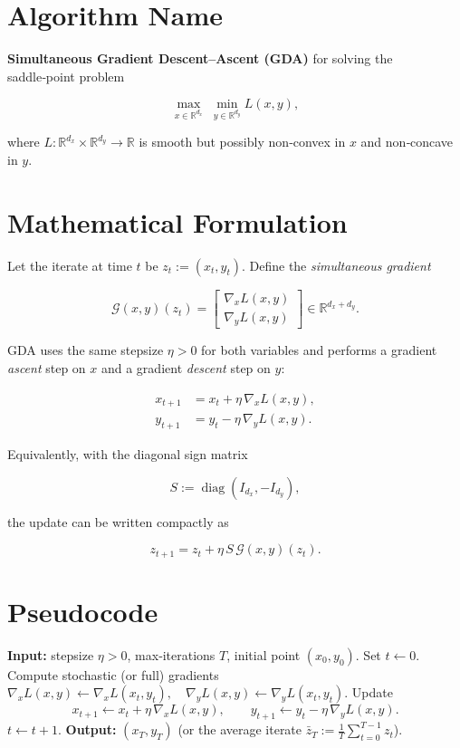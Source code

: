 \documentclass{article}
\newcommand{\gradx}{\nabla_{x} L(x,y)}
\newcommand{\grady}{\nabla_{y} L(x,y)}
\newcommand{\G}{\mathcal{G}(x,y)}
\begin{document}
\section*{Algorithm Name}
\textbf{Simultaneous Gradient Descent–Ascent (GDA)} for solving the saddle‑point problem  

\[
\max_{x\in\mathbb{R}^{d_x}}\;\min_{y\in\mathbb{R}^{d_y}} L(x,y),
\]

where \(L:\mathbb{R}^{d_x}\times\mathbb{R}^{d_y}\rightarrow\mathbb{R}\) is smooth but possibly non‑convex in \(x\) and non‑concave in \(y\).

\section*{Mathematical Formulation}
Let the iterate at time \(t\) be \(z_t:=(x_t,y_t)\).  
Define the \emph{simultaneous gradient}  

\[
\G(z_t)=\begin{bmatrix}
\gradx\\[2mm]
\grady
\end{bmatrix}\in\mathbb{R}^{d_x+d_y}.
\]

GDA uses the same stepsize \(\eta>0\) for both variables and performs a gradient \emph{ascent} step on \(x\) and a gradient \emph{descent} step on \(y\):

\[
\boxed{
\begin{aligned}
x_{t+1}&=x_t+\eta\,\gradx,\\
y_{t+1}&=y_t-\eta\,\grady .
\end{aligned}}
\tag{1}
\]

Equivalently, with the diagonal sign matrix  

\[
S:=\operatorname{diag}(I_{d_x},-I_{d_y}),
\]

the update can be written compactly as  

\[
z_{t+1}=z_t+\eta\,S\,\G(z_t). \tag{2}
\]

\section*{Pseudocode}
\begin{algorithm}[H]
\caption{Simultaneous Gradient Descent–Ascent (GDA)}
\begin{algorithmic}[1]
\STATE \textbf{Input:} stepsize \(\eta>0\), max‑iterations \(T\), initial point \((x_0,y_0)\).
\STATE Set \(t\gets0\).
    \STATE Compute stochastic (or full) gradients 
    \(\gradx \gets \nabla_x L(x_t,y_t),\quad
          \grady \gets \nabla_y L(x_t,y_t).\)
    \STATE Update 
    \[
    x_{t+1}\gets x_t+\eta\,\gradx,\qquad
    y_{t+1}\gets y_t-\eta\,\grady .
    \]
    \STATE \(t\gets t+1\).
\ENDWHILE
\STATE \textbf{Output:} \((x_T,y_T)\) (or the average iterate \(\bar z_T:=\tfrac1T\sum_{t=0}^{T-1}z_t\)). 
\end{algorithmic}
\end{algorithm}
\end{document}
